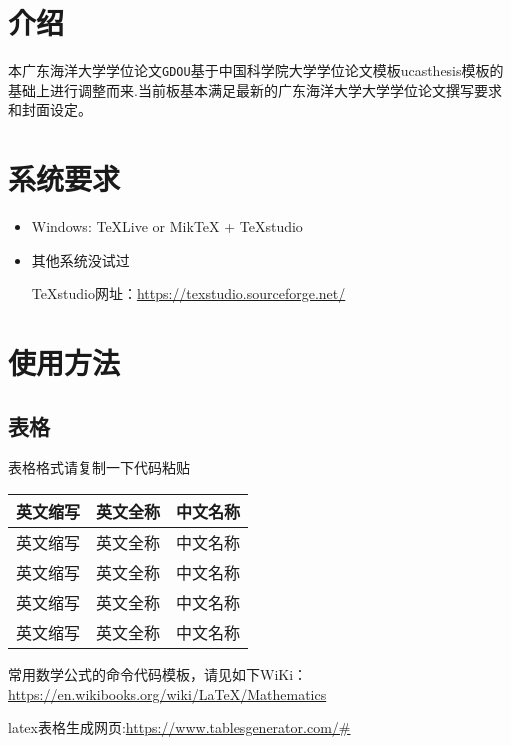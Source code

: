 
\label{chap:guide}

\section{介绍}

本广东海洋大学学位论文\texttt{GDOU}基于中国科学院大学学位论文模板ucasthesis模板的基础上进行调整而来.当前板基本满足最新的广东海洋大学大学学位论文撰写要求和封面设定。

\section{系统要求}
\begin{itemize}
	\item Windows: \TeX{}Live or Mik\TeX{}  + TeXstudio
	\item 其他系统没试过
	
	TeXstudio网址：\url{https://texstudio.sourceforge.net/}
\end{itemize}

\section{使用方法}
\subsection{表格}
表格格式请复制一下代码粘贴

\begin{table}[!h]
	\centering
	\footnotesize%
	\setlength{\tabcolsep}{5pt}%
	\renewcommand{\arraystretch}{1.2}%
	\begin{tabular}{ccc}
		\toprule[1.5pt]%
		英文缩写 &英文全称  &中文名称 \\ \hline
		英文缩写 &英文全称  &中文名称\\
		英文缩写 &英文全称  &中文名称\\
		英文缩写 &英文全称  &中文名称\\
		英文缩写 &英文全称  &中文名称\\
		\bottomrule [1.5pt]%
	\end{tabular}
	\label{tab:shiji}
\end{table}
常用数学公式的命令代码模板，请见如下WiKi：\url{https://en.wikibooks.org/wiki/LaTeX/Mathematics}

latex表格生成网页:\url{https://www.tablesgenerator.com/#} 



